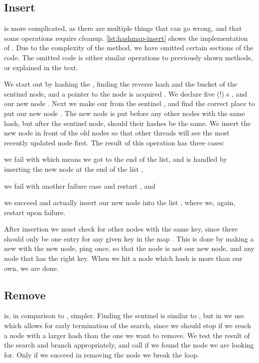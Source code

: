 \subsection{Insert}
 is more complicated, as there are multiple things that can go wrong, and
that some operations require cleanup. \cref{lst:hashmap-insert} shows the implementation of
. Due to the complexity of the method, we have omitted certain sections of the code.
The omitted code is either similar operations to previously shown methods, or explained in the
text.



We start out by hashing the , finding the reverse hash  and the bucket of
the sentinel node, and a pointer to the node is acquired . We declare five (!)
s , and  our new node .
Next we make our  from the sentinel , and find the correct place to put
our new node . The new node is put before any other nodes with the same hash, but
after the sentinel node, should their hashes be the same. We insert the new node in front of the
old nodes so that other threads will see the most recently updated node first. The result of this
operation has three cases:
\begin{enumerate*}[1) ]
  \item we fail with  which means we got to the end of the list, and is handled by
    inserting the new node at the end of the list  ,
  \item we fail with another failure case and restart , and
  \item we succeed and actually insert our new node into the list , where we, again,
    restart upon failure.
\end{enumerate*}

After insertion we must check for other nodes with the same key, since there should only be one
entry for any given key in the map . This is done by making a new  with
the new node, ping once, so that the  node is not our new node, and
 any node that has the right key.  When we hit a node which hash is more than our
own, we are done.


\subsection{Remove}
 is, in comparison to , simpler.
Finding the sentinel is similar to  , but in  we use
 which allows for early termination of the search, since we should stop if we
reach a node with a larger hash than the one we want to remove. We test the result of the search
 and branch appropriately, and call   if we found
the node we are looking for. Only if we succeed in removing the node we break the loop.

